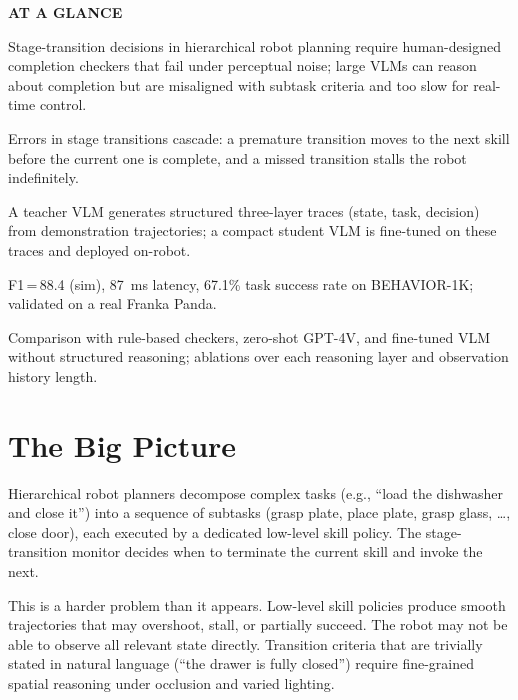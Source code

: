 \documentclass[10pt,twocolumn]{article}
\begin{document}
\begin{mdframed}[backgroundcolor=boxgray,linecolor=rulered,linewidth=1pt,
    innerleftmargin=6pt,innerrightmargin=6pt,
    innertopmargin=6pt,innerbottommargin=6pt]
\textbf{\small AT A GLANCE}\par\vspace{4pt}
\begin{description}[leftmargin=0pt,labelsep=4pt,itemsep=2pt,parsep=0pt,
    font=\small\bfseries]
  \item[Problem:] Stage-transition decisions in hierarchical robot
    planning require human-designed completion checkers that fail under
    perceptual noise; large VLMs can reason about completion but are
    misaligned with subtask criteria and too slow for real-time control.
  \item[Why it matters:] Errors in stage transitions cascade: a premature
    transition moves to the next skill before the current one is complete,
    and a missed transition stalls the robot indefinitely.
  \item[Method:] A teacher VLM generates structured three-layer traces
    (state, task, decision) from demonstration trajectories; a compact
    student VLM is fine-tuned on these traces and deployed on-robot.
  \item[Result:] F1\,=\,88.4 (sim), 87~ms latency, 67.1\% task success
    rate on BEHAVIOR-1K; validated on a real Franka Panda.
  \item[Evidence:] Comparison with rule-based checkers, zero-shot GPT-4V,
    and fine-tuned VLM without structured reasoning; ablations over
    each reasoning layer and observation history length.
\end{description}
\end{mdframed}

\section{The Big Picture}

Hierarchical robot planners decompose complex tasks (e.g.,
``load the dishwasher and close it'') into a sequence of subtasks
(grasp plate, place plate, grasp glass, \ldots, close door), each
executed by a dedicated low-level skill policy. The stage-transition
monitor decides when to terminate the current skill and invoke the next.

This is a harder problem than it appears. Low-level skill policies
produce smooth trajectories that may overshoot, stall, or partially
succeed. The robot may not be able to observe all relevant state directly.
Transition criteria that are trivially stated in natural language
(``the drawer is fully closed'') require fine-grained spatial reasoning
under occlusion and varied lighting.
\end{document}
